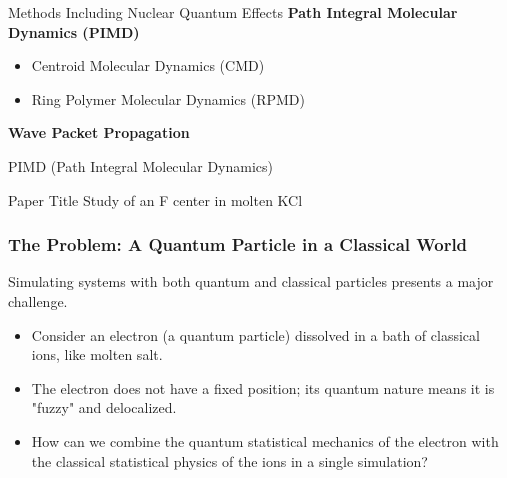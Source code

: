\begin{frame}{Methods Including Nuclear Quantum Effects}
    \textbf{Path Integral Molecular Dynamics (PIMD)}
    \begin{itemize}
        \item Centroid Molecular Dynamics (CMD)
        \item Ring Polymer Molecular Dynamics (RPMD)
    \end{itemize}
    \vspace{1em}

    \textbf{Wave Packet Propagation}
\end{frame}


\begin{frame}{PIMD (Path Integral Molecular Dynamics)}
	\begin{block}{Paper Title}
	Study of an F center in molten KCl
	\end{block}
\end{frame}

\begin{frame}
  \frametitle{The Problem: A Quantum Particle in a Classical World}
  
  Simulating systems with both quantum and classical particles presents a major challenge. \pause
  
  \begin{itemize}
    \item Consider an electron (a quantum particle) dissolved in a bath of classical ions, like molten salt. \pause
    
    \item The electron does not have a fixed position; its quantum nature means it is "fuzzy" and delocalized. \pause
    
    \item How can we combine the quantum statistical mechanics of the electron with the classical statistical physics of the ions in a single simulation?
  \end{itemize}
\end{frame}

